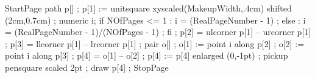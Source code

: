 StartPage
path p[] ;
p[1] := unitsquare xyscaled(MakeupWidth,.4cm) shifted (2cm,0.7cm) ;
numeric i;
if NOfPages <= 1 :
  i = (RealPageNumber - 1) ;
else :
  i = (RealPageNumber - 1)/(NOfPages - 1) ;
fi ;
p[2] = ulcorner p[1] -- urcorner p[1] ;
p[3] = llcorner p[1] -- lrcorner p[1] ;
pair o[] ;
o[1] := point i along p[2] ;
o[2] := point i along p[3] ;
p[4] = o[1] -- o[2] ;
p[4] := p[4] enlarged (0,-1pt) ;
pickup pensquare scaled 2pt ;
draw p[4] ;
StopPage
\stopuseMPgraphic







\setupSlideTitle
   [\c!after=,
    \c!alternative=layer,
    \c!width=\textwidth,
    \c!align=\v!center,
    \c!height=1.5cm]


\setupitemize[1][inmargin]

\protect
\stopmodule

\endinput
